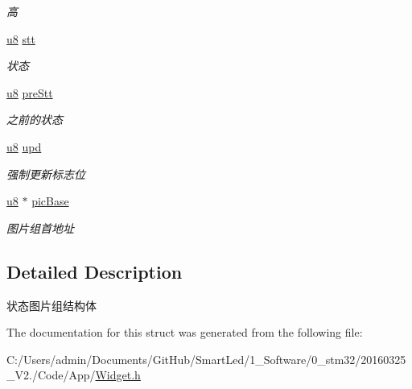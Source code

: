 \begin{DoxyCompactItemize}
\begin{DoxyCompactList}\small\item\em 高 \end{DoxyCompactList}\item 
\hypertarget{struct_s_t_r___stt_pic_a80fabf8814bb01529f412455604bd324}{\hyperlink{group___b_s_p_gaed742c436da53c1080638ce6ef7d13de}{u8} \hyperlink{struct_s_t_r___stt_pic_a80fabf8814bb01529f412455604bd324}{stt}}\label{struct_s_t_r___stt_pic_a80fabf8814bb01529f412455604bd324}

\begin{DoxyCompactList}\small\item\em 状态 \end{DoxyCompactList}\item 
\hypertarget{struct_s_t_r___stt_pic_a499a03417bffd6e7b4d86e8448657f4d}{\hyperlink{group___b_s_p_gaed742c436da53c1080638ce6ef7d13de}{u8} \hyperlink{struct_s_t_r___stt_pic_a499a03417bffd6e7b4d86e8448657f4d}{pre\-Stt}}\label{struct_s_t_r___stt_pic_a499a03417bffd6e7b4d86e8448657f4d}

\begin{DoxyCompactList}\small\item\em 之前的状态 \end{DoxyCompactList}\item 
\hypertarget{struct_s_t_r___stt_pic_a70f704b92411670f99563a59c6f9a4b5}{\hyperlink{group___b_s_p_gaed742c436da53c1080638ce6ef7d13de}{u8} \hyperlink{struct_s_t_r___stt_pic_a70f704b92411670f99563a59c6f9a4b5}{upd}}\label{struct_s_t_r___stt_pic_a70f704b92411670f99563a59c6f9a4b5}

\begin{DoxyCompactList}\small\item\em 强制更新标志位 \end{DoxyCompactList}\item 
\hypertarget{struct_s_t_r___stt_pic_a02bd89230705fe46d77cb967b1751eec}{\hyperlink{group___b_s_p_gaed742c436da53c1080638ce6ef7d13de}{u8} $\ast$ \hyperlink{struct_s_t_r___stt_pic_a02bd89230705fe46d77cb967b1751eec}{pic\-Base}}\label{struct_s_t_r___stt_pic_a02bd89230705fe46d77cb967b1751eec}

\begin{DoxyCompactList}\small\item\em 图片组首地址 \end{DoxyCompactList}\end{DoxyCompactItemize}


\subsection{\-Detailed \-Description}
状态图片组结构体 

\-The documentation for this struct was generated from the following file\-:\begin{DoxyCompactItemize}
\item 
\-C\-:/\-Users/admin/\-Documents/\-Git\-Hub/\-Smart\-Led/1\-\_\-\-Software/0\-\_\-stm32/20160325\-\_\-\-V2./\-Code/\-App/\hyperlink{_widget_8h}{\-Widget.\-h}\end{DoxyCompactItemize}
